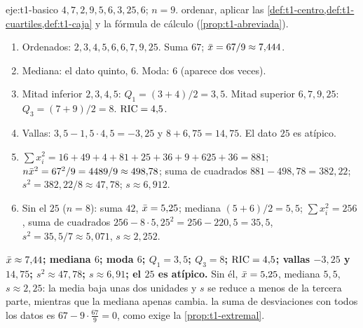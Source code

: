 \begin{solucion}{eje:t1-basico}
\datos $4,7,2,9,5,6,3,25,6$; $n=9$.
\planteamiento ordenar, aplicar las \cref{def:t1-centro,def:t1-cuartiles,def:t1-caja} y la fórmula de cálculo (\cref{prop:t1-abreviada}).
\pasos
\begin{enumerate}[label=\arabic*.]
  \item Ordenados: $2,3,4,5,6,6,7,9,25$. Suma $67$; $\bar{x}=67/9\approx 7{,}444$.
  \item Mediana: el dato quinto, $6$. Moda: $6$ (aparece dos veces).
  \item Mitad inferior $2,3,4,5$: $Q_1=(3+4)/2=3{,}5$. Mitad superior $6,7,9,25$: $Q_3=(7+9)/2=8$. $\operatorname{RIC}=4{,}5$.
  \item Vallas: $3{,}5-1{,}5\cdot4{,}5=-3{,}25$ y $8+6{,}75=14{,}75$. El dato $25$ es atípico.
  \item $\sum x_i^{2}=16+49+4+81+25+36+9+625+36=881$; $n\bar{x}^{2}=67^{2}/9=4489/9\approx 498{,}78$; suma de cuadrados $881-498{,}78=382{,}22$; $s^{2}=382{,}22/8\approx 47{,}78$; $s\approx 6{,}912$.
  \item Sin el $25$ ($n=8$): suma $42$, $\bar{x}=5{,}25$; mediana $(5+6)/2=5{,}5$; $\sum x_i^{2}=256$, suma de cuadrados $256-8\cdot5{,}25^{2}=256-220{,}5=35{,}5$, $s^{2}=35{,}5/7\approx5{,}071$, $s\approx 2{,}252$.
\end{enumerate}
\resultado \textbf{$\bar{x}\approx7{,}44$; mediana $6$; moda $6$; $Q_1=3{,}5$; $Q_3=8$; $\operatorname{RIC}=4{,}5$; vallas $-3{,}25$ y $14{,}75$; $s^{2}\approx47{,}78$; $s\approx6{,}91$; el $25$ es atípico.} Sin él, $\bar{x}=5{,}25$, mediana $5{,}5$, $s\approx2{,}25$: la media baja unas dos unidades y $s$ se reduce a menos de la tercera parte, mientras que la mediana apenas cambia.
\comprobacion la suma de desviaciones con todos los datos es $67-9\cdot\frac{67}{9}=0$, como exige la \cref{prop:t1-extremal}.
\end{solucion}

